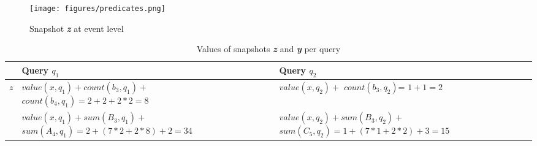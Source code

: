 \begin{figure}[t]
\centering
\texttt{[image: figures/predicates.png]}
\caption{Snapshot \textbf{\textit{z}} at event level}
\label{fig:predicates}
\end{figure}

\begin{table}[t]
    \centering
    \begin{tabular}{|c|p{6.8cm}|p{6.8cm}|}
    \hline
        & \textbf{Query} $q_1$
        & \textbf{Query} $q_2$ \\\hline\hline
        \multirow{2}{*}{$z$} 
        & $value(x,q_1) + count(b_3,q_1) +$ 
        $count(b_4,q_1) = 2+2+2*2 = 8$
        & $value(x,q_2) +$ $count(b_3,q_2)$= $1+1=2$ \\\hline
         \multirow{2}{*}{$y$}
        & $value(x,q_1) + sum(B_3,q_1) +$ 
        $sum(A_4,q_1) = 2 + (7*2 + 2*8) + 2 = 34$
        & $value(x,q_2) + sum(B_3,q_2) +$ 
        $sum(C_5,q_2) = 1 + (7*1 + 2*2) + 3 = 15$ \\\hline
    \end{tabular}
    \caption{Values of snapshots \textbf{\textit{z}} and \textbf{\textit{y}} per query}
    \label{tab:snapshots2}
\end{table}